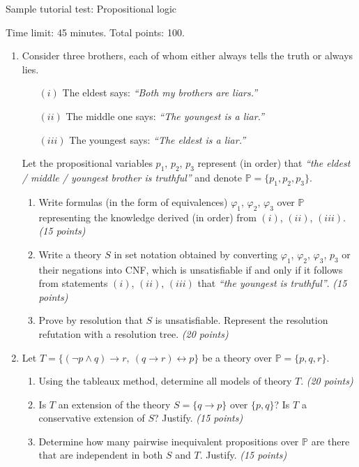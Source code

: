 \documentclass[a4paper]{article}
\begin{document}
\thispagestyle{empty}


\begin{center}
    \large{Sample tutorial test: Propositional logic}    
\end{center}

Time limit: 45 minutes. Total points: 100.

\bigskip

\begin{enumerate}
\item Consider three brothers, each of whom either always tells the truth or always lies.
\begin{enumerate}
\item[$(i)$] The eldest says: \emph{``Both my brothers are liars.''}
\item[$(ii)$] The middle one says: \emph{``The youngest is a liar.''}
\item[$(iii)$] The youngest says: \emph{``The eldest is a liar.''}
\end{enumerate}
Let the propositional variables $p_1$, $p_2$, $p_3$ represent (in order) that \emph{``the eldest / middle / youngest brother is truthful''} and denote $\mathbb{P}=\{p_1,p_2,p_3\}$.
\begin{enumerate}
\item Write formulas (in the form of equivalences) $\varphi_1$, $\varphi_2$, $\varphi_3$ over $\mathbb{P}$ representing the knowledge derived (in order) from $(i)$, $(ii)$, $(iii)$. {\it (15 points)}
\item Write a theory $S$ in set notation obtained by converting $\varphi_1$, $\varphi_2$, $\varphi_3$, $p_3$ or their negations into CNF, which is unsatisfiable if and only if it follows from statements $(i)$, $(ii)$, $(iii)$ that \emph{``the youngest is truthful''}. {\it (15 points)}
\item Prove by resolution that $S$ is unsatisfiable. Represent the resolution refutation with a resolution tree. {\it (20 points)}
\end{enumerate}

\item Let $T=\{(\neg p \wedge q) \to r,\ (q \to r) \leftrightarrow p\}$ be a theory over $\mathbb{P}=\{p,q,r\}$.
\begin{enumerate}
    \item Using the tableaux method, determine all models of theory $T$. {\it (20 points)}
    \item Is $T$ an extension of the theory $S=\{q \to p\}$ over $\{p,q\}$? Is $T$ a conservative extension of $S$? Justify. {\it (15 points)}
    \item Determine how many pairwise inequivalent propositions over $\mathbb{P}$ are there that are independent in both $S$ and $T$. Justify. {\it (15 points)}
\end{enumerate}

\end{enumerate}
\end{document}
